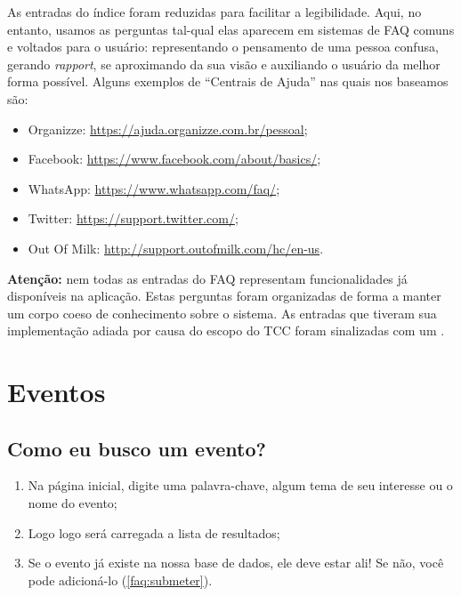 \documentclass[12pt,a4paper,twoside,hyphens,english,brazil]{abntex2}
\newcommand{\adiado}{{\color{Bittersweet}\framebox[1.1\width]{ADIADO}}}
\begin{document}
{\begin{framed}
	As entradas do índice foram reduzidas para facilitar a legibilidade. Aqui, no entanto, usamos as perguntas tal-qual elas aparecem em sistemas de FAQ comuns e voltados para o usuário: representando o pensamento de uma pessoa confusa, gerando \emph{rapport}, se aproximando da sua visão e auxiliando o usuário da melhor forma possível. Alguns exemplos de ``Centrais de Ajuda'' nas quais nos baseamos são:
	\begin{itemize}[itemsep=-1ex,topsep=-1ex]
		\item Organizze: \url{https://ajuda.organizze.com.br/pessoal};
		\item Facebook: \url{https://www.facebook.com/about/basics/};
		\item WhatsApp: \url{https://www.whatsapp.com/faq/};
		\item Twitter: \url{https://support.twitter.com/};
		\item Out Of Milk: \url{http://support.outofmilk.com/hc/en-us}.
	\end{itemize}
\end{framed}

\begin{framed}
	\noindent
	\textbf{Atenção:} nem todas as entradas do FAQ representam funcionalidades já disponíveis na aplicação. Estas perguntas foram organizadas de forma a manter um corpo coeso de conhecimento sobre o sistema. As entradas que tiveram sua implementação adiada por causa do escopo do TCC foram sinalizadas com um \adiado.
\end{framed}

\section{Eventos} %
\subsection{Como eu busco um evento?} \label{faq:busca}
\begin{enumerate}[itemsep=-1ex]
	\item Na página inicial, digite uma palavra-chave, algum tema de seu interesse ou o nome do evento;
	\item Logo logo será carregada a lista de resultados;
	\item Se o evento já existe na nossa base de dados, ele deve estar ali! Se não, você pode adicioná-lo (\autoref{faq:submeter}).
\end{enumerate}

}
\end{document}
